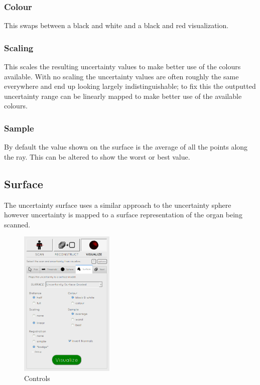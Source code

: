 \subsubsection{Colour}
This swaps between a black and white and a black and red visualization.

\subsubsection{Scaling}
This scales the resulting uncertainty values to make better use of the colours available. With no scaling the uncertainty values are often roughly the same everywhere and end up looking largely indistinguishable; to fix this the outputted uncertainty range can be linearly mapped to make better use of the available colours.

\subsubsection{Sample}
By default the value shown on the surface is the average of all the points along the ray. This can be altered to show the worst or best value.

\clearpage
\subsection{Surface}\label{implementation:surface}
The uncertainty surface uses a similar approach to the uncertainty sphere however uncertainty is mapped to a surface representation of the organ being scanned.

\begin{figure}
  \vspace{-20pt}
  \includegraphics[width=0.4\textwidth]{images/tool/4_surface.png}
  \caption{Controls}\label{fig:surface_settings}
\end{figure}

